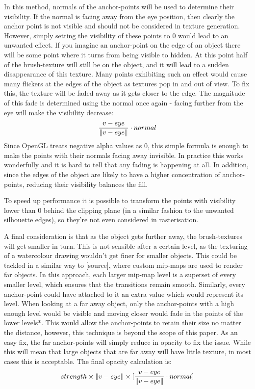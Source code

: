 \documentclass[a4paper, 12pt]{article}
\DeclarePairedDelimiter{\norm}{\lVert}{\rVert}
\begin{document}
In this method, normals of the anchor-points will be used to determine their visibility. If the normal is facing away from the eye position, then clearly the anchor point is not visible and should not be considered in texture generation. However, simply setting the visibility of these points to 0 would lead to an unwanted effect. If you imagine an anchor-point on the edge of an object there will be some point where it turns from being visible to hidden. At this point half of the brush-texture will still be on the object, and it will lead to a sudden disappearance of this texture. Many points exhibiting such an effect would cause many flickers at the edges of the object as textures pop in and out of view. To fix this, the texture will be faded away as it gets closer to the edge. The magnitude of this fade is determined using the normal once again - facing further from the eye will make the visibility decrease:
$$\frac{v-eye}{\norm{v-eye}} \cdot normal$$
Since OpenGL treats negative alpha values as 0, this simple formula is enough to make the points with their normals facing away invisible. In practice this works wonderfully and it is hard to tell that any fading is happening at all. In addition, since the edges of the object are likely to have a higher concentration of anchor-points, reducing their visibility balances the fill.

To speed up performance it is possible to transform the points with visibility lower than 0 behind the clipping plane (in a similar fashion to the unwanted silhouette edges), so they're not even considered in rasterisation.

A final consideration is that as the object gets further away, the brush-textures will get smaller in turn. This is not sensible after a certain level, as the texturing of a watercolour drawing wouldn't get finer for smaller objects. This could be tackled in a similar way to [source], where custom mip-maps are used to render far objects. In this approach, each larger mip-map level is a superset of every smaller level, which ensures that the transitions remain smooth. Similarly, every anchor-point could have attached to it an extra value which would represent its level. When looking at a far away object, only the anchor-points with a high enough level would be visible and moving closer would fade in the points of the lower levels*. This would allow the anchor-points to retain their size no matter the distance, however, this technique is beyond the scope of this paper. As an easy fix, the far anchor-points will simply reduce in opacity to fix the issue. While this will mean that large objects that are far away will have little texture, in most cases this is acceptable. The final opacity calculation is:
$$strength \times \norm{v-eye} \times [\frac{v-eye}{\norm{v-eye}} \cdot normal]$$
\end{document}
